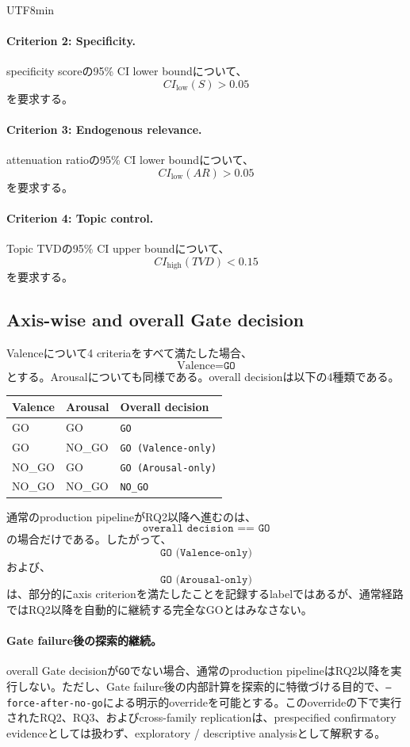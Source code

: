 \documentclass{article} %
\begin{document}
\begin{CJK*}{UTF8}{min}
\paragraph{Criterion 2: Specificity.}
specificity scoreの95\% CI lower boundについて、
\[
CI_{\mathrm{low}}(S)>0.05
\]
を要求する。


\paragraph{Criterion 3: Endogenous relevance.}
attenuation ratioの95\% CI lower boundについて、
\[
CI_{\mathrm{low}}(AR)>0.05
\]
を要求する。


\paragraph{Criterion 4: Topic control.}
Topic TVDの95\% CI upper boundについて、
\[
CI_{\mathrm{high}}(TVD)<0.15
\]
を要求する。


\subsection{Axis-wise and overall Gate decision}

Valenceについて4 criteriaをすべて満たした場合、
\[
\text{Valence}=\texttt{GO}
\]
とする。Arousalについても同様である。overall decisionは以下の4種類である。

\begin{center}
\small
\begin{tabular}{lll}
\toprule
Valence & Arousal & Overall decision \\
\midrule
GO & GO & \texttt{GO} \\
GO & NO\_GO & \texttt{GO (Valence-only)} \\
NO\_GO & GO & \texttt{GO (Arousal-only)} \\
NO\_GO & NO\_GO & \texttt{NO\_GO} \\
\bottomrule
\end{tabular}
\end{center}

通常のproduction pipelineがRQ2以降へ進むのは、
\[
\texttt{overall decision == GO}
\]
の場合だけである。したがって、
\[
\texttt{GO (Valence-only)}
\]
および、
\[
\texttt{GO (Arousal-only)}
\]
は、部分的にaxis criterionを満たしたことを記録するlabelではあるが、通常経路ではRQ2以降を自動的に継続する完全なGOとはみなさない。
\paragraph{Gate failure後の探索的継続。}
overall Gate decisionが\texttt{GO}でない場合、通常のproduction pipelineはRQ2以降を実行しない。ただし、Gate failure後の内部計算を探索的に特徴づける目的で、\texttt{--force-after-no-go}による明示的overrideを可能とする。このoverrideの下で実行されたRQ2、RQ3、およびcross-family replicationは、prespecified confirmatory evidenceとしては扱わず、exploratory / descriptive analysisとして解釈する。


\end{CJK*}
\end{document}
